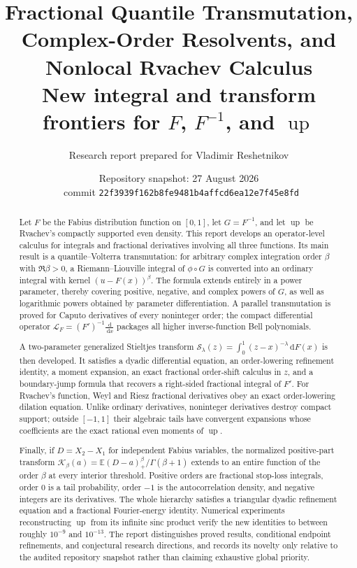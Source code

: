 \documentclass[11pt,oneside]{article}
\title{\bfseries Fractional Quantile Transmutation,\\
Complex-Order Resolvents, and Nonlocal Rvachev Calculus\\[0.45em]
\large New integral and transform frontiers for $F$, $F^{-1}$, and $\operatorname{up}$}
\author{Research report prepared for Vladimir Reshetnikov}
\date{Repository snapshot: 27 August 2026\\
\small \repo\ commit \texttt{22f3939f162b8fe9481b4affcd6ea12e7f45e8fd}}
\theoremstyle{definition}
\theoremstyle{remark}
\newcommand{\E}{\mathbb E}
\newcommand{\Up}{\operatorname{up}}
\newcommand{\dd}{\,\mathrm d}
\newcommand{\LapF}{\mathcal L_F}
\newcommand{\Kord}{\mathcal K}
\newcommand{\Sord}{\mathcal S}
\begin{document}
\maketitle

\begin{abstract}
Let $F$ be the Fabius distribution function on $[0,1]$, let $G=F^{-1}$,
and let $\Up$ be Rvachev's compactly supported even density.  This report
develops an operator-level calculus for integrals and fractional derivatives
involving all three functions.  Its main result is a quantile--Volterra
transmutation: for arbitrary complex integration order $\beta$ with
$\Re\beta>0$, a Riemann--Liouville integral of $\phi\circ G$ is converted into
an ordinary integral with kernel $(u-F(x))^\beta$.  The formula extends
entirely in a power parameter, thereby covering positive, negative, and
complex powers of $G$, as well as logarithmic powers obtained by
parameter differentiation.  A parallel transmutation is proved for Caputo
derivatives of every noninteger order; the compact differential operator
$\LapF=(F')^{-1}\frac{\dd}{\dd x}$ packages all higher inverse-function Bell
polynomials.

A two-parameter generalized Stieltjes transform
$\Sord_\lambda(z)=\int_0^1(z-x)^{-\lambda}\dd F(x)$ is then developed.  It
satisfies a dyadic differential equation, an order-lowering refinement
identity, a moment expansion, an exact fractional order-shift calculus in
$z$, and a boundary-jump formula that recovers a right-sided fractional
integral of $F'$.  For Rvachev's function, Weyl and Riesz fractional
derivatives obey an exact order-lowering dilation equation.  Unlike ordinary
derivatives, noninteger derivatives destroy compact support; outside
$[-1,1]$ their algebraic tails have convergent expansions whose coefficients
are the exact rational even moments of $\Up$.

Finally, if $D=X_2-X_1$ for independent Fabius variables, the normalized
positive-part transform
$\Kord_\beta(a)=\E(D-a)_+^\beta/\Gamma(\beta+1)$ extends to an entire function
of the order $\beta$ at every interior threshold.  Positive orders are
fractional stop-loss integrals, order $0$ is a tail probability, order $-1$
is the autocorrelation density, and negative integers are its derivatives.
The whole hierarchy satisfies a triangular dyadic refinement equation and a
fractional Fourier-energy identity.  Numerical experiments reconstructing
$\Up$ from its infinite sinc product verify the new identities to between
roughly $10^{-9}$ and $10^{-13}$.  The report distinguishes proved results,
conditional endpoint refinements, and conjectural research directions, and
records its novelty only relative to the audited repository snapshot rather
than claiming exhaustive global priority.
\end{abstract}
\end{document}

